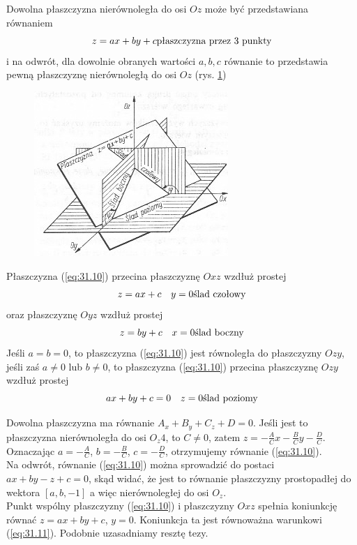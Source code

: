 \begin{pkt}{31.6}
	Dowolna płaszczyzna nierównoległa do osi $Oz$ może być przedstawiana równaniem
\begin{equation}
	z=ax+by+c \hfill	\textrm{płaszczyzna przez 3 punkty}
	\label{eq:31.10}
\end{equation}
i na odwrót, dla dowolnie obranych wartości $a, b, c$ równanie to przedstawia pewną płaszczyznę nierównoległą do osi $Oz$ (rys. \ref{fig:31.5})
\begin{figure}[ht]
	\centering
		\includegraphics{rys/31_5.png}
	\caption{ }
	\label{fig:31.5}
\end{figure}
Płaszczyzna (\ref{eq:31.10}) przecina płaszczyznę $Oxz$ wzdłuż prostej
\begin{equation}
	z=ax+c \quad y=0 \hfill	\textrm{ślad czołowy}
	\label{eq:31.11}
\end{equation}
oraz płaszczyznę $Oyz$ wzdłuż prostej
\begin{equation}
	z=by+c \quad x=0 \hfill	\textrm{ślad boczny}
	\label{eq:31.12}
\end{equation}
Jeśli $a = b = 0$, to płaszczyzna (\ref{eq:31.10}) jest równoległa do płaszczyzny $Ozy$, jeśli zaś $a\neq 0$ lub $b\neq 0$, to płaszczyzna (\ref{eq:31.10}) przecina płaszczyznę $Ozy$ wzdłuż prostej
\begin{equation}
	ax + by + c = 0 \quad z=0 \hfill	\textrm{ślad poziomy}
	\label{eq:31.13}
\end{equation}
\end{pkt}
\begin{dowod}
Dowolna płaszczyzna ma równanie $A_x + B_y + C_z + D = 0$. Jeśli jest to płaszczyzna nierównoległa do osi $O_z4$, to $C \neq 0$, zatem $z = - \frac{A}{C}x - \frac{B}{C}y - \frac{D}{C}$. Oznaczając $a = - \frac{A}{C}$, $b = - \frac{B}{C}$, $c = - \frac{D}{C}$, otrzymujemy równanie (\ref{eq:31.10}).\\
Na odwrót, równanie (\ref{eq:31.10}) można sprowadzić do postaci $ax + by - z + c = 0$, skąd widać, że jest to równanie płaszczyzny prostopadłej do wektora $[a, b, -1]$ a więc nierównoległej do osi $O_z$. \\
Punkt wspólny płaszczyzny (\ref{eq:31.10}) i płaszczyzny $Oxz$ spełnia koniunkcję równać $z = ax + by + c$, $y = 0$. Koniunkcja ta jest równoważna warunkowi (\ref{eq:31.11}). Podobnie uzasadniamy resztę tezy.
\end{dowod}
